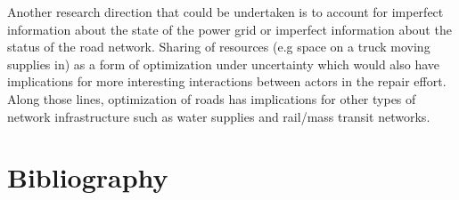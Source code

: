 \documentclass{article}
\begin{document}
	Another research direction that could be undertaken is to account for imperfect information about the state of the power grid or imperfect information about the status of the road network. Sharing of resources (e.g space on a truck moving supplies in) as a form of optimization under uncertainty which would also have implications for more interesting interactions between actors in the repair effort. Along those lines, optimization of roads has implications for other types of network infrastructure such as water supplies and rail/mass transit networks.
	
	\section{Bibliography}
	
	
\end{document}
